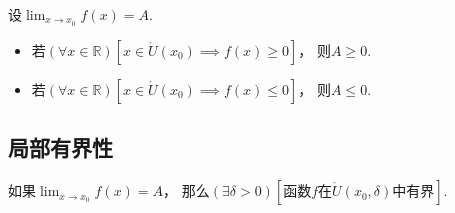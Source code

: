 \begin{corollary}\label{theorem:极限.函数极限的局部保号性3}
设\(\lim_{x \to x_0} f(x) = A\).
\begin{itemize}
	\item 若\((\forall x\in\mathbb{R})
	[x\in\mathring{U}(x_0) \implies f(x) \geq 0]\)，
	则\(A \geq 0\).
	\item 若\((\forall x\in\mathbb{R})
	[x\in\mathring{U}(x_0) \implies f(x) \leq 0]\)，
	则\(A \leq 0\).
\end{itemize}
\end{corollary}

\subsection{局部有界性}
\begin{corollary}[局部有界性]\label{theorem:极限.函数极限的局部有界性}
如果\(\lim_{x \to x_0} f(x) = A\)，
那么\((\exists\delta>0)[\text{函数$f$在$\mathring{U}(x_0,\delta)$中有界}]\).
\end{corollary}
